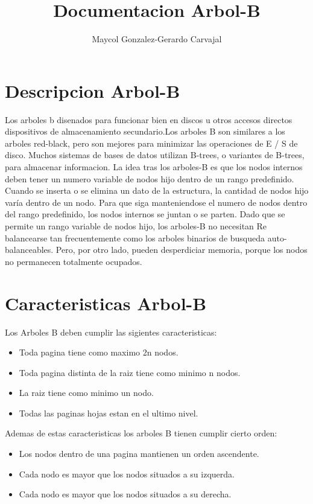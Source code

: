 \documentclass[10pt,letterpaper]{article}
\author{Maycol Gonzalez-Gerardo Carvajal}
\title{Documentacion Arbol-B}
\begin{document}
\maketitle
\newpage
\tableofcontents
\newpage
\section{Descripcion Arbol-B}
\vskip 0.5cm
Los arboles b disenados para funcionar bien en discos u otros accesos directos
dispositivos de almacenamiento secundario.Los arboles B son similares a los arboles red-black, pero son mejores para minimizar las operaciones de E / S de disco. Muchos sistemas de bases de datos utilizan B-trees, o variantes de B-trees, para almacenar informacion.
\vskip 0.3cm
La idea tras los arboles-B es que los nodos internos deben tener un numero variable de nodos hijo dentro de un rango predefinido. Cuando se inserta o se elimina un dato de la estructura, la cantidad de nodos hijo varía dentro de un nodo. Para que siga manteniendose el numero de nodos dentro del rango predefinido, los nodos internos se juntan o se parten. Dado que se permite un rango variable de nodos hijo, los arboles-B no necesitan Re balancearse tan frecuentemente como los arboles binarios de busqueda auto-balanceables. Pero, por otro lado, pueden desperdiciar memoria, porque los nodos no permanecen totalmente ocupados.
\vskip 2cm
\section{Caracteristicas Arbol-B}
\vskip 0.3cm
Los Arboles B deben cumplir las sigientes caracteristicas:
\vskip 0.3cm
\begin{itemize}
\item Toda pagina tiene como maximo 2n nodos.
\item Toda pagina distinta de la raiz tiene como minimo n nodos.
\item La raiz tiene como minimo un nodo.
\item Todas las paginas hojas estan en el ultimo nivel.
\end{itemize}
\vskip 0.3cm
Ademas de estas caracteristicas los arboles B tienen cumplir cierto orden:
\vskip 0.3cm
\begin{itemize}
\item Los nodos dentro de una pagina mantienen un orden ascendente.
\item Cada nodo es mayor que los nodos situados a su izquerda.
\item Cada nodo es mayor que los nodos situados a su derecha.
\end{itemize}
\vskip 0.3cm
\newpage
\end{document}
